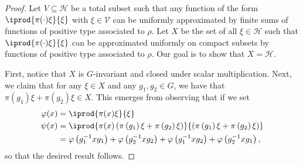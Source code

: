 \documentclass[10pt]{mypackage}
\begin{document}
\begin{proof}
  Let $V\subseteq \mathscr{H}$ be a total subset such that any function of the form $ \iprod{\pi(\cdot)\xi}{\xi} $ with $\xi\in \mathcal{V}$ can be uniformly approximated by finite sums of functions of positive type associated to $\rho$. Let $X$ be the set of all $\xi\in \mathscr{H}$ such that $ \iprod{\pi(\cdot)\xi}{\xi} $ can be approximated uniformly on compact subsets by functions of positive type associated to $\rho$. Our goal is to show that $X = \mathscr{H}$.

  First, notice that $ X $ is $G$-invariant and closed under scalar multiplication. Next, we claim that for any $\xi\in X$ and any $g_1,g_2\in G$, we have that $\pi\left(g_1\right)\xi + \pi\left( g_2 \right)\xi\in X$. This emerges from observing that if we set
  \begin{align*}
    \varphi(x) &= \iprod{\pi(x)\xi}{\xi}\\
    \psi(x) &= \iprod{\pi(x)\left( \pi\left( g_1 \right)\xi + \pi\left( g_2 \right)\xi \right)}{ \left( \pi\left( g_1 \right)\xi + \pi\left( g_2 \right)\xi \right) }\\
            &= \varphi\left( g_1^{-1}xg_1 \right) + \varphi\left( g_2^{-1}xg_2 \right) + \varphi\left( g_1^{-1}xg_2 \right) + \varphi\left( g_2^{-1}xg_1 \right),
  \end{align*}
  so that the desired result follows.


\end{proof}
\end{document}
